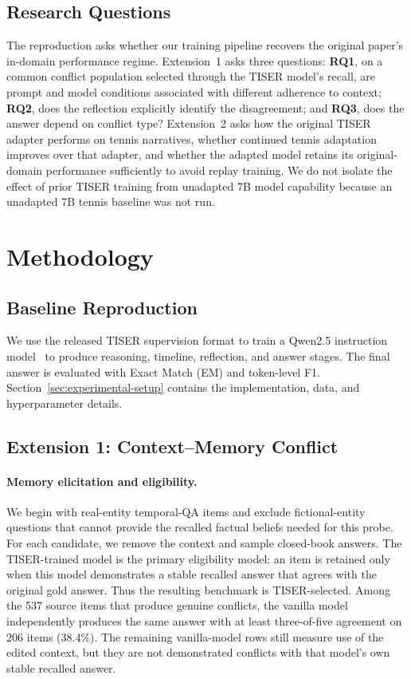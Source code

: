 \documentclass[conference]{IEEEtran}
\begin{document}
\subsection{Research Questions}

The reproduction asks whether our training pipeline recovers the original paper's in-domain performance regime. Extension~1 asks three questions: \textbf{RQ1}, on a common conflict population selected through the TISER model's recall, are prompt and model conditions associated with different adherence to context; \textbf{RQ2}, does the reflection explicitly identify the disagreement; and \textbf{RQ3}, does the answer depend on conflict type? Extension~2 asks how the original TISER adapter performs on tennis narratives, whether continued tennis adaptation improves over that adapter, and whether the adapted model retains its original-domain performance sufficiently to avoid replay training. We do not isolate the effect of prior TISER training from unadapted 7B model capability because an unadapted 7B tennis baseline was not run.

\section{Methodology}
\label{sec:methodology}

\subsection{Baseline Reproduction}

We use the released TISER supervision format to train a Qwen2.5 instruction model~\cite{qwen2024qwen25} to produce reasoning, timeline, reflection, and answer stages. The final answer is evaluated with Exact Match (EM) and token-level F1. Section~\ref{sec:experimental-setup} contains the implementation, data, and hyperparameter details.

\subsection{Extension 1: Context--Memory Conflict}

\paragraph{Memory elicitation and eligibility.}
We begin with real-entity temporal-QA items and exclude fictional-entity questions that cannot provide the recalled factual beliefs needed for this probe. For each candidate, we remove the context and sample closed-book answers. The TISER-trained model is the primary eligibility model: an item is retained only when this model demonstrates a stable recalled answer that agrees with the original gold answer. Thus the resulting benchmark is TISER-selected. Among the 537 source items that produce genuine conflicts, the vanilla model independently produces the same answer with at least three-of-five agreement on 206 items (38.4\%). The remaining vanilla-model rows still measure use of the edited context, but they are not demonstrated conflicts with that model's own stable recalled answer.
\end{document}
